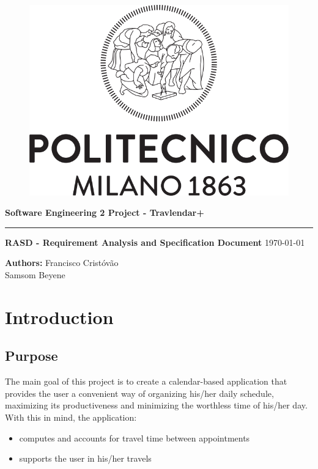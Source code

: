 \documentclass[12pt]{article}
\begin{document}
\begin{titlepage}
    \begin{center}
    \begin{figure}
        \centering
        \includegraphics[scale=0.2]{logoPolimi.png}
        \vspace{1.5cm}
    \end{figure}

    \Huge\textbf{Software Engineering 2 Project - Travlendar+}
    \rule{12cm}{0.5pt}
    \Huge\textbf{RASD - Requirement Analysis and Specification Document}
    \today
    \end{center}
    
    \vspace{3cm}
    
    \begin{flushleft}
        \LARGE\textbf{Authors: }
        \newline\newline
        \Large\texttt{}{Francisco Cristóvão \\ Samsom Beyene}
    \end{flushleft}



\end{titlepage}

\newpage
  \tableofcontents
\newpage

\section{Introduction}
\subsection{Purpose}
The main goal of this project is to create a calendar-based application that provides the user a convenient way of organizing his/her daily schedule, maximizing its productiveness and minimizing the worthless time of his/her day. With this in mind, the application:
\begin{itemize}
\item computes and accounts for travel time between appointments
\item supports the user in his/her travels
\end{itemize}
\end{document}
